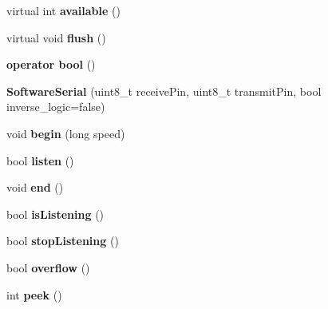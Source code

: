 \begin{DoxyCompactItemize}
\mbox{\label{class_software_serial_a4cbf77a4e90e15ca576972d7952659c5}} 
virtual int {\bfseries available} ()
\item 
\mbox{\label{class_software_serial_a9a46db376a19fc958e011e38799b902c}} 
virtual void {\bfseries flush} ()
\item 
\mbox{\label{class_software_serial_ab0cba63b2a27fcfa4760a2f3f7389de0}} 
{\bfseries operator bool} ()
\item 
\mbox{\label{class_software_serial_aab36336db4a1ca5073071c07d910cb87}} 
{\bfseries Software\+Serial} (uint8\+\_\+t receive\+Pin, uint8\+\_\+t transmit\+Pin, bool inverse\+\_\+logic=false)
\item 
\mbox{\label{class_software_serial_af1b194359d70894b3a2f38236a68480e}} 
void {\bfseries begin} (long speed)
\item 
\mbox{\label{class_software_serial_ad235539ef28939836bd0bde9387eb8fc}} 
bool {\bfseries listen} ()
\item 
\mbox{\label{class_software_serial_a9034270f7de617b3cc7d3f38f3a8e0df}} 
void {\bfseries end} ()
\item 
\mbox{\label{class_software_serial_a7b3fb4a8f57d2b5f2233f841d71ef80f}} 
bool {\bfseries is\+Listening} ()
\item 
\mbox{\label{class_software_serial_a1c87a6b43c176c104f28e2c2eec2841e}} 
bool {\bfseries stop\+Listening} ()
\item 
\mbox{\label{class_software_serial_ac6d4d5dfbe05515bf23766e2c8abfd46}} 
bool {\bfseries overflow} ()
\item 
\mbox{\label{class_software_serial_a51c2d2e79f0d982b1ef9cc9ac4453648}} 
int {\bfseries peek} ()
\item 
\mbox{\label{class_software_serial_ad35c61492ca373f2bdc108ebc7dcdda7}} 

\end{DoxyCompactItemize}
